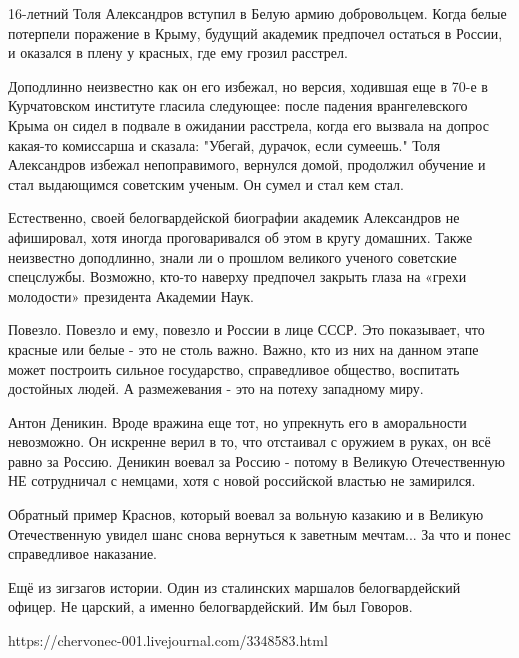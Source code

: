 \documentclass[a4paper,11pt]{extreport}
\begin{document}
16-летний Толя Александров вступил в Белую армию добровольцем. Когда белые
потерпели поражение в Крыму, будущий академик предпочел остаться в России, и
оказался в плену у красных, где ему грозил расстрел.

Доподлинно неизвестно как он его избежал, но версия, ходившая еще в 70-е в
Курчатовском институте гласила следующее: после падения врангелевского Крыма он
сидел в подвале в ожидании расстрела, когда его вызвала на допрос какая-то
комиссарша и сказала: "Убегай, дурачок, если сумеешь." Толя Александров избежал
непоправимого, вернулся домой, продолжил обучение и стал выдающимся советским
ученым. Он сумел и стал кем стал.

Естественно, своей белогвардейской биографии академик Александров не
афишировал, хотя иногда проговаривался об этом в кругу домашних. Также
неизвестно доподлинно, знали ли о прошлом великого ученого советские
спецслужбы. Возможно, кто-то наверху предпочел закрыть глаза на «грехи
молодости» президента Академии Наук.

Повезло. Повезло и ему, повезло и России в лице СССР.  Это показывает, что
красные или белые - это не столь важно. Важно, кто из них на данном этапе может
построить сильное государство, справедливое общество, воспитать достойных
людей. А размежевания - это на потеху западному миру.

Антон Деникин. Вроде вражина еще тот, но упрекнуть его в аморальности
невозможно. Он искренне верил в то, что отстаивал с оружием в руках, он всё
равно за Россию. Деникин воевал за Россию - потому в Великую Отечественную НЕ
сотрудничал с немцами, хотя с новой российской властью не замирился.

Обратный пример Краснов, который воевал за вольную казакию и в Великую
Отечественную увидел шанс снова вернуться к заветным мечтам... За что и понес
справедливое наказание.

Ещё из зигзагов истории. Один из сталинских маршалов белогвардейский офицер. Не
царский, а именно белогвардейский. Им был Говоров.

https://chervonec-001.livejournal.com/3348583.html
  
 
 
\end{document}
